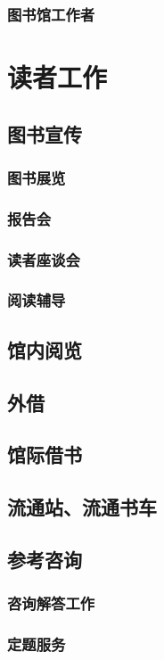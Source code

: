 \documentclass[UTF8]{../../ApplicationUniverse}
\begin{document}
    \subsubsection{图书馆工作者}

\section{读者工作}
    \subsection{图书宣传}
        \subsubsection{图书展览}
        \subsubsection{报告会}
        \subsubsection{读者座谈会}
        \subsubsection{阅读辅导}
    \subsection{馆内阅览}
    \subsection{外借}
    \subsection{馆际借书}
    \subsection{流通站、流通书车}
    \subsection{参考咨询}
        \subsubsection{咨询解答工作}
        \subsubsection{定题服务}
\end{document}
